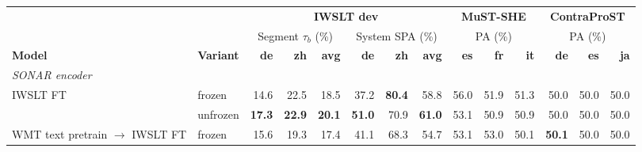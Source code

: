 \begin{table}[t]
\centering
\footnotesize
\setlength{\tabcolsep}{3pt}
\begin{tabular}{p{3cm}l|rrr|rrr|rrr|rrr}
\toprule
 & & \multicolumn{6}{c|}{\textbf{IWSLT dev}} & \multicolumn{3}{c|}{\textbf{MuST-SHE}} & \multicolumn{3}{c}{\textbf{ContraProST}} \\
 & & \multicolumn{3}{c|}{Segment $\tau_b$ (\%)} & \multicolumn{3}{c|}{System SPA (\%)} & \multicolumn{3}{c|}{PA (\%)} & \multicolumn{3}{c}{PA (\%)} \\
\cmidrule(lr){3-5}\cmidrule(lr){6-8}\cmidrule(lr){9-11}\cmidrule(lr){12-14}
\textbf{Model} & \textbf{Variant} & \textbf{de} & \textbf{zh} & \textbf{avg} & \textbf{de} & \textbf{zh} & \textbf{avg} & \textbf{es} & \textbf{fr} & \textbf{it} & \textbf{de} & \textbf{es} & \textbf{ja} \\
\midrule
\multicolumn{14}{l}{\textit{SONAR encoder}} \\
\midrule
\multirow{2}{*}{\parbox[t]{3cm}{\raggedright IWSLT FT}} & frozen & \cellcolor[RGB]{201,232,231}14.6 & \cellcolor[RGB]{186,225,225}22.5 & \cellcolor[RGB]{196,230,229}18.5 & \cellcolor[RGB]{219,239,239}37.2 & \cellcolor[RGB]{183,224,223}\textbf{80.4} & \cellcolor[RGB]{195,229,228}58.8 & \cellcolor[RGB]{250,188,139}56.0 & \cellcolor[RGB]{252,221,196}51.9 & \cellcolor[RGB]{253,234,220}51.3 & \cellcolor[RGB]{255,255,255}50.0 & \cellcolor[RGB]{255,255,255}50.0 & \cellcolor[RGB]{255,255,255}50.0 \\
 & unfrozen & \cellcolor[RGB]{183,224,223}\textbf{17.3} & \cellcolor[RGB]{183,224,223}\textbf{22.9} & \cellcolor[RGB]{183,224,223}\textbf{20.1} & \cellcolor[RGB]{183,224,223}\textbf{51.0} & \cellcolor[RGB]{216,238,238}70.9 & \cellcolor[RGB]{183,224,223}\textbf{61.0} & \cellcolor[RGB]{252,220,195}53.1 & \cellcolor[RGB]{253,238,227}50.9 & \cellcolor[RGB]{254,241,230}50.9 & \cellcolor[RGB]{255,255,255}50.0 & \cellcolor[RGB]{255,255,255}50.0 & \cellcolor[RGB]{255,255,255}50.0 \\
\cmidrule(l){1-14}
\multirow{2}{*}{\parbox[t]{3cm}{\raggedright WMT text pretrain $\to$ IWSLT FT}} & frozen & \cellcolor[RGB]{195,229,228}15.6 & \cellcolor[RGB]{209,235,235}19.3 & \cellcolor[RGB]{206,234,233}17.4 & \cellcolor[RGB]{209,235,235}41.1 & \cellcolor[RGB]{225,242,242}68.3 & \cellcolor[RGB]{216,238,238}54.7 & \cellcolor[RGB]{252,220,195}53.1 & \cellcolor[RGB]{251,201,162}53.0 & \cellcolor[RGB]{254,253,252}50.1 & \cellcolor[RGB]{232,168,205}\textbf{50.1} & \cellcolor[RGB]{255,255,255}50.0 & \cellcolor[RGB]{255,255,255}50.0 \\

\end{tabular}
\end{table}
